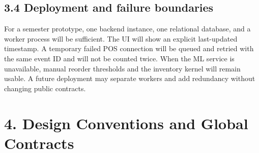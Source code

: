 \subsection{3.4 Deployment and failure boundaries}\label{deployment-and-failure-boundaries}

For a semester prototype, one backend instance, one relational database, and a worker process will be sufficient. The UI will show an explicit last-updated timestamp. A temporary failed POS connection will be queued and retried with the same event ID and will not be counted twice. When the ML service is unavailable, manual reorder thresholds and the inventory kernel will remain usable. A future deployment may separate workers and add redundancy without changing public contracts.









\clearpage
\section{4. Design Conventions and Global Contracts}\label{design-conventions-and-global-contracts}

